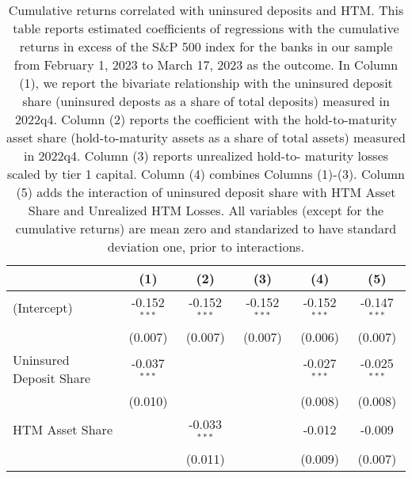 
\begin{table}[htbp]
   \caption{\label{tab:dep_htm} Cumulative returns correlated with uninsured deposits and HTM. This table reports estimated coefficients of regressions with the cumulative returns in excess of the S\&P 500 index for the banks in our sample from February 1, 2023 to March 17, 2023 as the outcome.  In Column (1), we report the bivariate relationship with the uninsured deposit share (uninsured deposts as a share of total
   deposits) measured in 2022q4. Column (2) reports the coefficient with the hold-to-maturity asset share (hold-to-maturity assets
   as a share of total assets) measured in 2022q4. Column (3) reports unrealized hold-to-
   maturity losses scaled by tier 1 capital. Column (4) combines Columns (1)-(3). Column (5) adds the interaction of uninsured deposit share with HTM Asset Share and Unrealized HTM Losses. All variables (except for the cumulative returns) are mean zero and standarized to have standard deviation one, prior to interactions.}
   \bigskip
   \centering
   \begin{adjustbox}{width = 1.2\textwidth, center}
      \begin{tabular}{lccccc}
         \toprule
                                                                                  & (1)            & (2)            & (3)            & (4)            & (5)\\  
         \midrule 
         (Intercept)                                                              & -0.152$^{***}$ & -0.152$^{***}$ & -0.152$^{***}$ & -0.152$^{***}$ & -0.147$^{***}$\\   
                                                                                  & (0.007)        & (0.007)        & (0.007)        & (0.006)        & (0.007)\\   
         Uninsured Deposit Share                                                  & -0.037$^{***}$ &                &                & -0.027$^{***}$ & -0.025$^{***}$\\   
                                                                                  & (0.010)        &                &                & (0.008)        & (0.008)\\   
         HTM Asset Share                                                          &                & -0.033$^{***}$ &                & -0.012         & -0.009\\   
                                                                                  &                & (0.011)        &                & (0.009)        & (0.007)\\   

\end{tabular}
\end{adjustbox}
\end{table}
